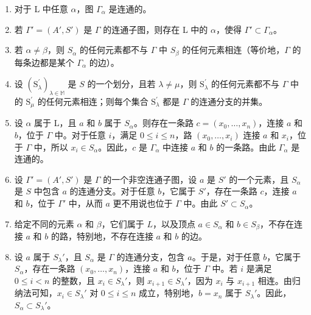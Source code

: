 \begin{enumerate}
\def\labelenumi{(\roman{enumi})}
\item
  对于 L 中任意 \(\alpha\)，图 \(\Gamma_{\alpha}\) 是连通的。
\item
  若 \(\Gamma' = (A', S')\) 是 \(\Gamma\) 的连通子图，则存在 L 中的 \(\alpha\)，使得 \(\Gamma' \subset \Gamma_{\alpha}\)。
\item
  若 \(\alpha \neq \beta\)，则 \(S_{\alpha}\) 的任何元素都不与 \(\Gamma\) 中 \(S_{\beta}\) 的任何元素相连（等价地，\(\Gamma\) 的每条边都是某个 \(\Gamma_{\alpha}\) 的边）。
\item
  设 \((\mathrm{S}_{\lambda}^{\prime})_{\lambda \in \mathbb{M}}\) 是 \(S\) 的一个划分，且若 \(\lambda \neq \mu\)，则 \(\mathrm{S}_{\lambda}^{\prime}\) 的任何元素都不与 \(\Gamma\) 中的 \(\mathrm{S}_{\mu}^{\prime}\) 的任何元素相连；则每个集合 \(\mathrm{S}_{\lambda}^{\prime}\) 都是 \(\Gamma\) 的连通分支的并集。
\item
  设 \(\alpha\) 属于 L，且 \(a\) 和 \(b\) 属于 \(S_{\alpha}\)。则存在一条路 \(c = (x_0, \ldots, x_n)\)，连接 \(a\) 和 \(b\)，位于 \(\Gamma\) 中。对于任意 \(i\)，满足 \(0 \leqslant i \leqslant n\)，路 \((x_0, \ldots, x_i)\) 连接 \(a\) 和 \(x_i\)，位于 \(\Gamma\) 中，所以 \(x_i \in S_{\alpha}\)。因此，\(c\) 是 \(\Gamma_{\alpha}\) 中连接 \(a\) 和 \(b\) 的一条路。由此 \(\Gamma_{\alpha}\) 是连通的。
\item
  设 \(\Gamma' = (A', S')\) 是 \(\Gamma\) 的一个非空连通子图，设 \(a\) 是 \(S'\) 的一个元素，且 \(S_{\alpha}\) 是 \(S\) 中包含 \(a\) 的连通分支。对于任意 \(b\)，它属于 \(S'\)，存在一条路 \(c\)，连接 \(a\) 和 \(b\)，位于 \(\Gamma'\) 中，从而 \(a\) 更不用说也位于 \(\Gamma\) 中。由此 \(S' \subset S_{\alpha}\)。
\item
  给定不同的元素 \(\alpha\) 和 \(\beta\)，它们属于 \(L\)，以及顶点 \(a \in S_{\alpha}\) 和 \(b \in S_{\beta}\)，不存在连接 \(a\) 和 \(b\) 的路，特别地，不存在连接 \(a\) 和 \(b\) 的边。
\item
  设 \(a\) 属于 \(S_{\lambda}'\)，且 \(S_{\alpha}\) 是 \(\Gamma\) 的连通分支，包含 \(a\)。于是，对于任意 \(b\)，它属于 \(S_{\alpha}\)，存在一条路 \((x_0, \ldots, x_n)\)，连接 \(a\) 和 \(b\)，位于 \(\Gamma\) 中。若 \(i\) 是满足 \(0 \leqslant i < n\) 的整数，且 \(x_i \in S_{\lambda}'\)，则 \(x_{i+1} \in S_{\lambda}'\)，因为 \(x_i\) 与 \(x_{i+1}\) 相连。由归纳法可知，\(x_i \in S_{\lambda}'\) 对 \(0 \leqslant i \leqslant n\) 成立，特别地，\(b = x_n\) 属于 \(S_{\lambda}'\)。因此，\(S_{\alpha} \subset S_{\lambda}'\)。
\end{enumerate}

